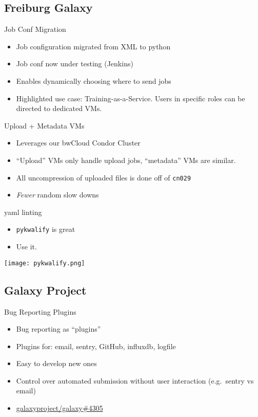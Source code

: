\documentclass[12pt]{ufrslides}
\newcommand{\ghpr}[3]{\href{https://github.com/#1/#2/pull/#3}{#1/#2\##3}}
\begin{document}
\subsection{Freiburg Galaxy}
	\begin{frame}{Job Conf Migration}
		\begin{itemize}
			\item Job configuration migrated from XML to python
			\item Job conf now under testing (Jenkins)
			\item Enables dynamically choosing where to send jobs
			\item Highlighted use case: Training-as-a-Service. Users in specific roles can be directed to dedicated VMs.
		\end{itemize}
	\end{frame}

	\begin{frame}{Upload + Metadata VMs}
		\begin{itemize}
			\item Leverages our bwCloud Condor Cluster
			\item ``Upload'' VMs only handle upload jobs, ``metadata'' VMs are similar.
			\item All uncompression of uploaded files is done off of \texttt{cn029}
			\item \emph{Fewer} random slow downs
		\end{itemize}
	\end{frame}

	\begin{frame}{yaml linting}
		\begin{itemize}
			\item \texttt{pykwalify} is great
			\item Use it.
		\end{itemize}
		\texttt{[image: pykwalify.png]}
	\end{frame}

\subsection{Galaxy Project}
	\begin{frame}{Bug Reporting Plugins}
		\begin{itemize}
			\item Bug reporting as ``plugins''
			\item Plugins for: email, sentry, GitHub, influxdb, logfile
			\item Easy to develop new ones
			\item Control over automated submission without user interaction (e.g.~sentry vs email)
			\item \ghpr{galaxyproject}{galaxy}{4305}
		\end{itemize}
	\end{frame}
\end{document}

